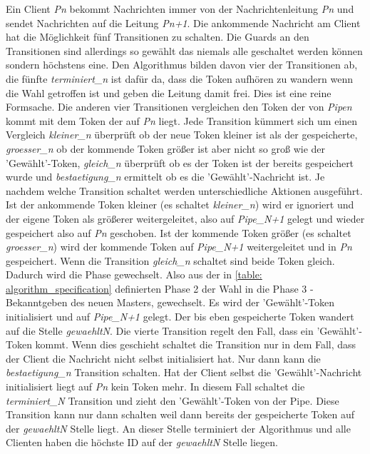 Ein Client \textit{P{n}} bekommt Nachrichten immer von der Nachrichtenleitung \textit{Pn} und sendet Nachrichten auf die Leitung \textit{Pn+1}. Die ankommende Nachricht am Client hat die Möglichkeit fünf Transitionen zu schalten. Die Guards an den Transitionen sind allerdings so gewählt das niemals alle geschaltet werden können sondern höchstens eine. Den Algorithmus bilden davon vier der Transitionen ab, die fünfte \textit{terminiert\_n} ist dafür da, dass die Token aufhören zu wandern wenn die Wahl getroffen ist und geben die Leitung damit frei. Dies ist eine reine Formsache. Die anderen vier Transitionen vergleichen den Token der von \textit{Pipen} kommt mit dem Token der auf \textit{Pn} liegt. Jede Transition kümmert sich um einen Vergleich \textit{kleiner\_n} überprüft ob der neue Token kleiner ist als der gespeicherte, \textit{groesser\_n} ob der kommende Token größer ist aber nicht so groß wie der 'Gewählt'-Token, \textit{gleich\_n} überprüft ob es der Token ist der bereits gespeichert wurde und \textit{bestaetigung\_n} ermittelt ob es die 'Gewählt'-Nachricht ist. Je nachdem welche Transition schaltet werden unterschiedliche Aktionen ausgeführt. Ist der ankommende Token kleiner (es schaltet \textit{kleiner\_n}) wird er ignoriert und der eigene Token als größerer weitergeleitet, also auf \textit{Pipe\_N+1} gelegt und wieder gespeichert also auf \textit{Pn} geschoben. Ist der kommende Token größer (es schaltet \textit{groesser\_n}) wird der kommende Token auf \textit{Pipe\_N+1} weitergeleitet und in \textit{Pn} gespeichert. Wenn die Transition \textit{gleich\_n} schaltet sind beide Token gleich. Dadurch wird die Phase gewechselt. Also aus der in \ref{table: algorithm_specification} definierten Phase 2 der Wahl in die Phase 3 - Bekanntgeben des neuen Masters, gewechselt. Es wird der 'Gewählt'-Token initialisiert und auf \textit{Pipe\_N+1} gelegt. Der bis eben gespeicherte Token wandert auf die Stelle \textit{gewaehltN}. Die vierte Transition regelt den Fall, dass ein 'Gewählt'-Token kommt. Wenn dies geschieht schaltet die Transition nur in dem Fall, dass der Client die Nachricht nicht selbst initialisiert hat. Nur dann kann die \textit{bestaetigung\_n} Transition schalten. Hat der Client selbst die 'Gewählt'-Nachricht initialisiert liegt auf \textit{Pn} kein Token mehr. In diesem Fall schaltet die \textit{terminiert\_N} Transition und zieht den 'Gewählt'-Token von der Pipe. Diese Transition kann nur dann schalten weil dann bereits der gespeicherte Token auf der \textit{gewaehltN} Stelle liegt.
An dieser Stelle terminiert der Algorithmus und alle Clienten haben die höchste ID auf der \textit{gewaehltN} Stelle liegen.

